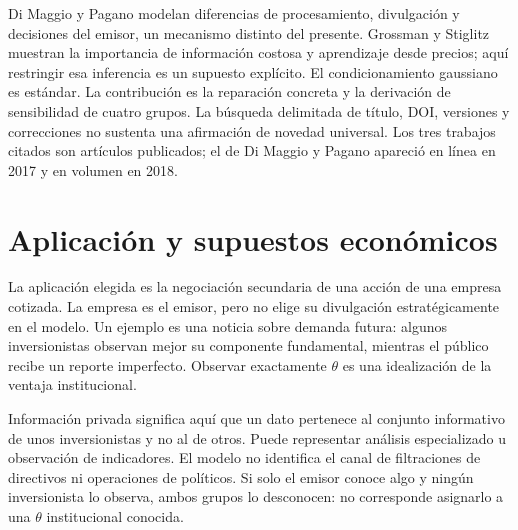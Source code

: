 \documentclass[11pt]{article}
\begin{document}
Di Maggio y Pagano \cite{dimaggio2018} modelan diferencias de procesamiento,
divulgación y decisiones del emisor, un mecanismo distinto del presente.
Grossman y Stiglitz \cite{grossman1980} muestran la importancia de información
costosa y aprendizaje desde precios; aquí restringir esa inferencia es un
supuesto explícito. El condicionamiento gaussiano es estándar. La contribución
es la reparación concreta y la derivación de sensibilidad de cuatro grupos.
La búsqueda delimitada de título, DOI, versiones y correcciones no sustenta
una afirmación de novedad universal. Los tres trabajos citados son artículos
publicados; el de Di Maggio y Pagano apareció en línea en 2017 y en volumen
en 2018.

\section{Aplicación y supuestos económicos}
La aplicación elegida es la negociación secundaria de una acción de una
empresa cotizada. La empresa es el emisor, pero no elige su divulgación
estratégicamente en el modelo. Un ejemplo es una noticia sobre demanda
futura: algunos inversionistas observan mejor su componente fundamental,
mientras el público recibe un reporte imperfecto. Observar exactamente
$\theta$ es una idealización de la ventaja institucional.

Información privada significa aquí que un dato pertenece al conjunto
informativo de unos inversionistas y no al de otros. Puede representar
análisis especializado u observación de indicadores. El modelo no identifica
el canal de filtraciones de directivos ni operaciones de políticos. Si solo
el emisor conoce algo y ningún inversionista lo observa, ambos grupos lo
desconocen: no corresponde asignarlo a una $\theta$ institucional conocida.
\end{document}

